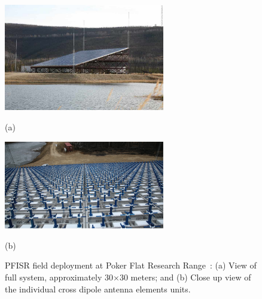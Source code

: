 
\begin{figure}[htb]
  \begin{minipage}[t]{0.49\linewidth}\centering
    \includegraphics[width=7cm]{amisrimage2}
    \medskip
    \centerline{(a)}
  \end{minipage}\hfill
  \begin{minipage}[t]{0.49\linewidth}\centering
    \includegraphics[width=7cm]{amisrface}
    \medskip
    \centerline{(b)}
  \end{minipage}
  \caption{PFISR field deployment at Poker Flat Research Range~\citep{Valentic:2013jg}: (a) View of full system, approximately 30$\times$30 meters; and (b) Close up view of the individual cross dipole antenna elements units. }
  \label{fig:amisrpic}
\end{figure}

